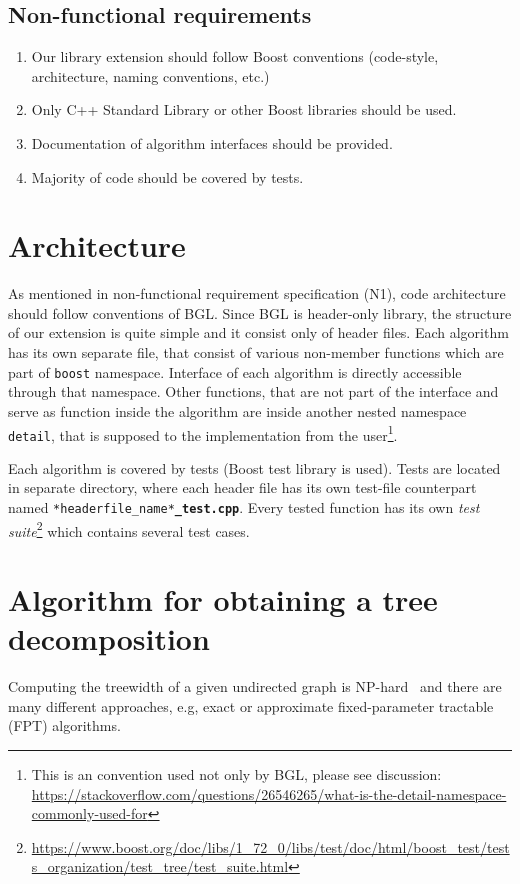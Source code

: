 \documentclass[thesis=B,english]{FITthesis}[2019/03/21]
\begin{document}
\subsection{Non-functional requirements}
\begin{enumerate}[N1)]
	\item Our library extension should follow Boost conventions (code-style, architecture, naming conventions, etc.)
	\item Only C++ Standard Library or other Boost libraries should be used.
	\item Documentation of algorithm interfaces should be provided.
	\item Majority of code should be covered by tests.
\end{enumerate}

\section{Architecture}
As mentioned in non-functional requirement specification (N1), code architecture should follow conventions of BGL. Since BGL is header-only library, the structure of our extension is quite simple and it consist only of header files. Each algorithm has its own separate file, that consist of various non-member functions which are part of \texttt{boost} namespace. Interface of each algorithm is directly accessible through that namespace. Other functions, that are not part of the interface and serve as  function inside the algorithm are inside another nested namespace \texttt{detail}, that is supposed to  the implementation from the user\footnote{This is an  convention used not only by BGL, please see discussion: \url{https://stackoverflow.com/questions/26546265/what-is-the-detail-namespace-commonly-used-for}}.

Each algorithm is covered by tests (Boost test library is used). Tests are located in separate directory, where each header file has its own test-file counterpart named \texttt{*headerfile\_name*\textbf{\_test.cpp}}. Every tested function has its own \emph{test suite}\footnote{\url{https://www.boost.org/doc/libs/1_72_0/libs/test/doc/html/boost_test/tests_organization/test_tree/test_suite.html}} which contains several test cases.

\section{Algorithm for obtaining a tree decomposition}\label{sec:algorithm_td}
Computing the treewidth of a given undirected graph is NP-hard~\cite{tree_decomposition_complexity} and there are many different approaches, e.g, exact or approximate fixed-parameter tractable (FPT) algorithms.
\end{document}
